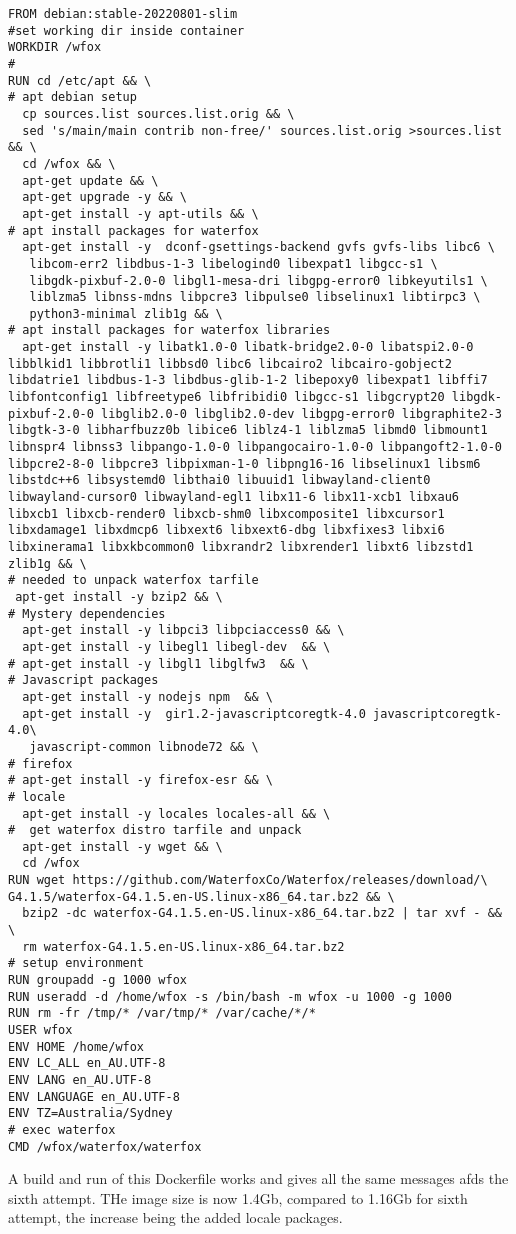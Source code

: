 \documentclass{article}  %
\begin{document}
\begin{verbatim}
FROM debian:stable-20220801-slim
#set working dir inside container
WORKDIR /wfox
#
RUN cd /etc/apt && \
# apt debian setup
  cp sources.list sources.list.orig && \
  sed 's/main/main contrib non-free/' sources.list.orig >sources.list && \
  cd /wfox && \
  apt-get update && \
  apt-get upgrade -y && \
  apt-get install -y apt-utils && \
# apt install packages for waterfox
  apt-get install -y  dconf-gsettings-backend gvfs gvfs-libs libc6 \
   libcom-err2 libdbus-1-3 libelogind0 libexpat1 libgcc-s1 \
   libgdk-pixbuf-2.0-0 libgl1-mesa-dri libgpg-error0 libkeyutils1 \
   liblzma5 libnss-mdns libpcre3 libpulse0 libselinux1 libtirpc3 \
   python3-minimal zlib1g && \
# apt install packages for waterfox libraries
  apt-get install -y libatk1.0-0 libatk-bridge2.0-0 libatspi2.0-0 libblkid1 libbrotli1 libbsd0 libc6 libcairo2 libcairo-gobject2 libdatrie1 libdbus-1-3 libdbus-glib-1-2 libepoxy0 libexpat1 libffi7 libfontconfig1 libfreetype6 libfribidi0 libgcc-s1 libgcrypt20 libgdk-pixbuf-2.0-0 libglib2.0-0 libglib2.0-dev libgpg-error0 libgraphite2-3 libgtk-3-0 libharfbuzz0b libice6 liblz4-1 liblzma5 libmd0 libmount1 libnspr4 libnss3 libpango-1.0-0 libpangocairo-1.0-0 libpangoft2-1.0-0 libpcre2-8-0 libpcre3 libpixman-1-0 libpng16-16 libselinux1 libsm6 libstdc++6 libsystemd0 libthai0 libuuid1 libwayland-client0 libwayland-cursor0 libwayland-egl1 libx11-6 libx11-xcb1 libxau6 libxcb1 libxcb-render0 libxcb-shm0 libxcomposite1 libxcursor1 libxdamage1 libxdmcp6 libxext6 libxext6-dbg libxfixes3 libxi6 libxinerama1 libxkbcommon0 libxrandr2 libxrender1 libxt6 libzstd1 zlib1g && \
# needed to unpack waterfox tarfile
 apt-get install -y bzip2 && \
# Mystery dependencies
  apt-get install -y libpci3 libpciaccess0 && \
  apt-get install -y libegl1 libegl-dev  && \
# apt-get install -y libgl1 libglfw3  && \
# Javascript packages
  apt-get install -y nodejs npm  && \
  apt-get install -y  gir1.2-javascriptcoregtk-4.0 javascriptcoregtk-4.0\
   javascript-common libnode72 && \
# firefox
# apt-get install -y firefox-esr && \
# locale
  apt-get install -y locales locales-all && \
#  get waterfox distro tarfile and unpack
  apt-get install -y wget && \
  cd /wfox 
RUN wget https://github.com/WaterfoxCo/Waterfox/releases/download/\
G4.1.5/waterfox-G4.1.5.en-US.linux-x86_64.tar.bz2 && \
  bzip2 -dc waterfox-G4.1.5.en-US.linux-x86_64.tar.bz2 | tar xvf - && \
  rm waterfox-G4.1.5.en-US.linux-x86_64.tar.bz2
# setup environment
RUN groupadd -g 1000 wfox
RUN useradd -d /home/wfox -s /bin/bash -m wfox -u 1000 -g 1000
RUN rm -fr /tmp/* /var/tmp/* /var/cache/*/*
USER wfox
ENV HOME /home/wfox
ENV LC_ALL en_AU.UTF-8
ENV LANG en_AU.UTF-8
ENV LANGUAGE en_AU.UTF-8
ENV TZ=Australia/Sydney
# exec waterfox
CMD /wfox/waterfox/waterfox
\end{verbatim}
A build and run of this Dockerfile works and gives all the same messages afds the sixth attempt. THe image size is now 1.4Gb, compared to 1.16Gb for sixth attempt, the increase being the added locale packages.
\end{document}
